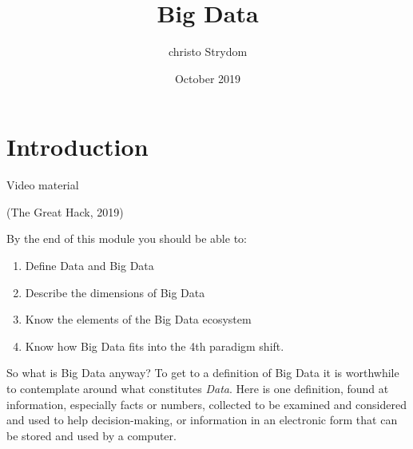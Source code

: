 \documentclass{book}
\title{Big Data}
\author{christo Strydom}
\date{October 2019}
\begin{document}
\maketitle

\chapter{Introduction}

Video material

(The Great Hack, 2019)

By the end of this module you should be able to:
\begin{enumerate}
	\item Define Data and Big Data
	\item Describe the dimensions of Big Data
	\item Know the elements of the Big Data ecosystem
	\item Know how Big Data fits into the 4th paradigm shift.
\end{enumerate}
So what is Big Data anyway?
To get to a definition of Big Data it is worthwhile to contemplate around what constitutes \textit{Data}.  Here is one definition, found at  \cite{Ach89}
information, especially facts or numbers, collected to be examined and considered and used to help decision-making, or information in an electronic form that can be stored and used by a computer.
\end{document}
